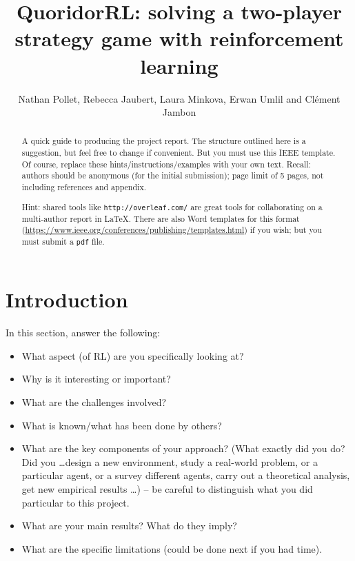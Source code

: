 \documentclass[journal, a4paper]{IEEEtran}
\newif\ifanonymous
\begin{document}
\title{QuoridorRL: solving a two-player strategy game with reinforcement learning}
\ifanonymous
\author{Anonymous Authors}
\else
\author{Nathan Pollet, Rebecca Jaubert, Laura Minkova, Erwan Umlil and Clément Jambon}
\fi
\maketitle

\begin{abstract}
	A quick guide to producing the project report. 
	The structure outlined here is a suggestion, but feel free to change if convenient. But you must use this IEEE template. Of course, replace these hints/instructions/examples with your own text. Recall: authors should be anonymous (for the initial submission); page limit of 5 pages, not including references and appendix. 
	
Hint: shared tools like \texttt{http://overleaf.com/} are great tools for collaborating on a multi-author report in \LaTeX. There are also Word templates for this format (\url{https://www.ieee.org/conferences/publishing/templates.html}) if you wish; but you must submit a \texttt{pdf} file. 
\end{abstract}

\section{Introduction}
\label{sec:intro}

In this section, answer the following: 

\begin{itemize}
	\item What aspect (of RL) are you specifically looking at?
	\item Why is it interesting or important?
	\item What are the challenges involved?  
	\item What is known/what has been done by others?
	\item What are the key components of your approach? (What exactly did you do? Did you \ldots design a new environment, study a real-world problem, or a particular agent, or a survey different agents, carry out a theoretical analysis, get new empirical results \ldots) -- be careful to distinguish what you did particular to this project. 
	\item What are your main results? What do they imply?
	\item  What are the specific limitations (could be done next if you had time). 
\end{itemize}
\end{document}
